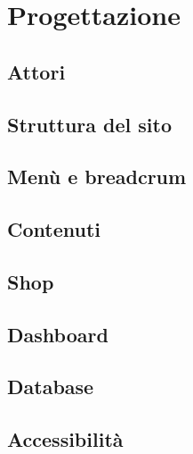 \section{Progettazione}

\subsection{Attori}

\subsection{Struttura del sito}

\subsection{Menù e breadcrum}

\subsection{Contenuti}

\subsection{Shop}

\subsection{Dashboard}

\subsection{Database}

\subsection{Accessibilità}